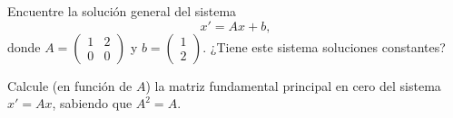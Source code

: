 \documentclass[12pt]{article}
\begin{document}
    \begin{ejercicio}
        Encuentre la solución general del sistema
        \begin{equation*}
            x'=Ax+b,
        \end{equation*}
        donde $A=\begin{pmatrix}
            1 & 2\\
            0 & 0
        \end{pmatrix}$ y $b=\begin{pmatrix}
            1\\
            2
        \end{pmatrix}$. ¿Tiene este sistema soluciones constantes?
    \end{ejercicio}

    \begin{ejercicio}
    Calcule (en función de $A$) la matriz fundamental principal en cero del sistema $x'=Ax$, sabiendo que $A^2=A$.
    \end{ejercicio}
\end{document}
